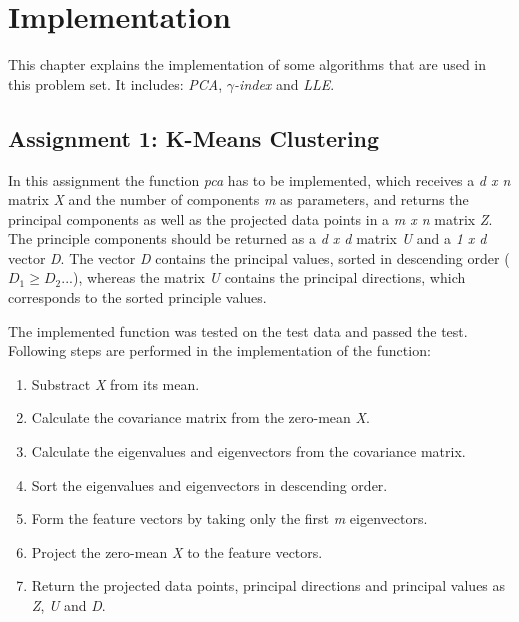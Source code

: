 \chapter{Implementation}
\label{chap:implementation}

This chapter explains the implementation of some algorithms that are used in this problem set. It includes: \textit{PCA}, \textit{$\gamma$-index} and \textit{LLE}.

\section{Assignment 1: K-Means Clustering}
\label{sec:assignment1}

In this assignment the function \textit{pca} has to be implemented, which receives a \textit{d x n} matrix \textit{X} and the number of components \textit{m} as parameters, and returns the principal components as well as the projected data points in a \textit{m x n} matrix \textit{Z}. The principle components should be returned as a \textit{d x d} matrix \textit{U} and a \textit{1 x d} vector \textit{D}. The vector \textit{D} contains the principal values, sorted in descending order ($D_1 \geq D_2 ...$), whereas the matrix \textit{U} contains the principal directions, which corresponds to the sorted principle values.

The implemented function was tested on the test data and passed the test. Following steps are performed in the implementation of the function:
\begin{enumerate}
	\item Substract \textit{X} from its mean.
	\item Calculate the covariance matrix from the zero-mean \textit{X}.
	\item Calculate the eigenvalues and eigenvectors from the covariance matrix.
	\item Sort the eigenvalues and eigenvectors in descending order.
	\item Form the feature vectors by taking only the first \textit{m} eigenvectors.
	\item Project the zero-mean \textit{X} to the feature vectors.
	\item Return the projected data points, principal directions and principal values as \textit{Z}, \textit{U} and \textit{D}.
\end{enumerate}


